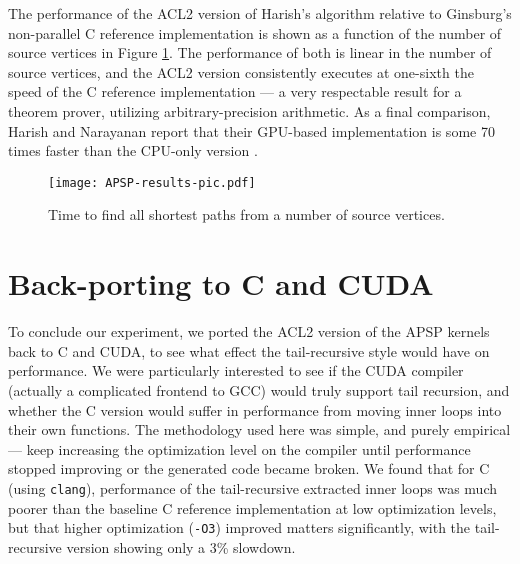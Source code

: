 \documentclass[copyright]{eptcs}
\begin{document}
The performance of the ACL2 version of Harish's algorithm
relative to Ginsburg's non-parallel C reference implementation
is shown as a function of the number of source vertices in Figure 
\ref{APSP-results-pic}.  The performance of both is linear in the
number of source vertices, and the ACL2 version consistently 
executes at one-sixth the speed of the C reference implementation --- 
a very respectable result for a theorem prover, utilizing
arbitrary-precision arithmetic.  As a final comparison, Harish and 
Narayanan report that their GPU-based implementation is 
some 70 times faster than the CPU-only version \cite{Harish2007}.

\begin{figure}
\begin{center}
\texttt{[image: APSP-results-pic.pdf]}
\end{center}
\caption{Time to find all shortest paths from a number of source vertices.}
\label{APSP-results-pic}
\end{figure}

\section{Back-porting to C and CUDA}

To conclude our experiment, we ported the ACL2 version of the APSP kernels 
back to C and CUDA, to see what effect the tail-recursive style would
have on performance.  We were particularly interested to see if the CUDA
compiler (actually a complicated frontend to GCC) would truly support
tail recursion, and whether the C version would suffer in performance from
moving inner loops into their own functions.  The methodology used 
here was simple, and purely empirical --- keep increasing the 
optimization level on the compiler until performance stopped 
improving or the generated code became broken.  We found that for C 
(using \texttt{clang}), performance of the tail-recursive extracted
inner loops was much poorer than the baseline C reference 
implementation at low optimization levels, but that higher 
optimization (\texttt{-O3}) improved matters significantly, with the 
tail-recursive version showing only a 3\% slowdown.  
\end{document}

